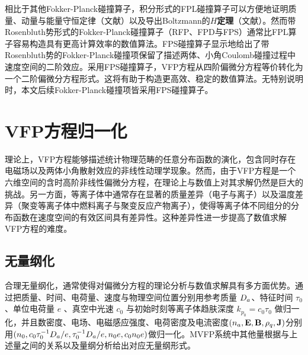   相比于其他Fokker-Planck碰撞算子，积分形式的FPL碰撞算子可以方便地证明质量、动量与能量守恒定律（文献）以及导出Boltzmann的\textbf{$H$定理}（文献）。然而带Rosenbluth势形式的Fokker-Planck碰撞算子（RFP、FPD与FPS）通常比FPL算子容易构造具有更高计算效率的数值算法。FPS碰撞算子显示地给出了带Rosenbluth势的Fokker-Planck碰撞项保留了描述两体、小角Coulomb碰撞过程中速度空间的二阶效应。采用FPS碰撞算子，VFP方程从四阶偏微分方程等价转化为一个二阶偏微分方程形式。这将有助于构造更高效、稳定的数值算法。无特别说明时，本文后续Fokker-Planck碰撞项皆采用FPS碰撞算子。
 
\section{VFP方程归一化}
\label{VFP方程归一化}

  理论上，VFP方程能够描述统计物理范畴的任意分布函数的演化，包含同时存在电磁场以及两体小角散射效应的非线性动理学现象。然而，由于VFP方程是一个六维空间的含时高阶非线性偏微分方程，在理论上与数值上对其求解仍然是巨大的挑战\cite{Heikkinen2007}。另一方面，等离子体中通常存在显著的质量差异（电子与离子）以及温度差异（聚变等离子体中燃料离子与聚变反应产物离子），使得等离子体不同组分的分布函数在速度空间的有效区间具有差异性。这种差异性进一步提高了数值求解VFP方程的难度。

\subsection{无量纲化}
\label{无量纲化}

  合理无量纲化，通常使得对偏微分方程的理论分析与数值求解具有多方面优势。通过把质量、时间、电荷量、速度与物理空间位置分别用参考质量 $D_a$、特征时间 $\tau_0$、单位电荷量 $e$ 、真空中光速 $c_0$ 与初始时刻等离子体趋肤深度 $k_{p_0} = c_0 \tau_0$ 做归一化，并且数密度、电场、电磁感应强度、电荷密度及电流密度$(n_a,\mathbf{E},\mathbf{B},\rho_q,\mathbf{J})$分别用$(n_0,c_0 \tau_0^{-1} D_a/e,\tau_0^{-1} D_a/e,n_0 e, c_0 n_0 e)$做归一化。MVFP系统中其他量根据与上述量之间的关系以及量纲分析给出对应无量纲形式。
  
